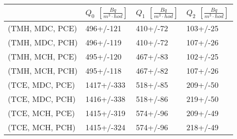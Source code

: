 \begin{tabular}{llll}
\toprule
{} & $Q_0$ $\left[\si{\frac{Bq}{m^3\cdot hod}}\right]$ & $Q_1$ $\left[\si{\frac{Bq}{m^3\cdot hod}}\right]$ & $Q_2$ $\left[\si{\frac{Bq}{m^3\cdot hod}}\right]$ \\
\midrule
(TMH, MDC, PCE) &  496+/-121 & 410+/-72 & 103+/-25 \\
(TMH, MDC, PCH) &  496+/-119 & 410+/-72 & 107+/-26 \\
(TMH, MCH, PCE) &  495+/-120 & 467+/-83 & 102+/-25 \\
(TMH, MCH, PCH) &  495+/-118 & 467+/-82 & 107+/-26 \\
(TCE, MDC, PCE) & 1417+/-333 & 518+/-85 & 209+/-50 \\
(TCE, MDC, PCH) & 1416+/-338 & 518+/-86 & 219+/-50 \\
(TCE, MCH, PCE) & 1415+/-319 & 574+/-96 & 209+/-49 \\
(TCE, MCH, PCH) & 1415+/-324 & 574+/-96 & 218+/-49 \\
\bottomrule
\end{tabular}
